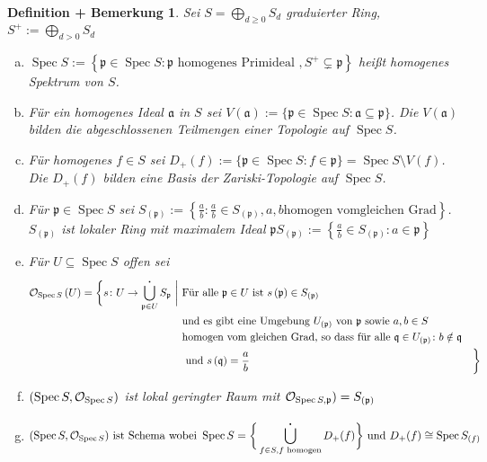 \documentclass[a4paper,oneside]{scrbook}
\theoremstyle{break}
\newtheorem{DefBem}[Def]{Definition + Bemerkung}
\theoremstyle{nonumberbreak}
\theoremstyle{nonumberplain}
\theoremstyle{break}
\newcommand{\Proj}{%
	\ensuremath{\operatorname{Spec}}%
}
\begin{document}
\begin{DefBem}
	Sei $S = \bigoplus_{d \geq 0} S_d$ graduierter Ring, $S^+:=\bigoplus_{d > 0} S_d$
	\begin{enumerate}[(a)]
		\item  $\Proj S := \left\lbrace \mathfrak{p} \in \Proj S: \mathfrak{p} \text{ homogenes Primideal }, S^+ \subsetneq \mathfrak{p} \right\rbrace $ heißt \emph{homogenes Spektrum} von $S$.
		\item Für ein homogenes Ideal $\mathfrak a$ in $S$ sei $V(\mathfrak{a}) := \{\mathfrak{p} \in \Proj S : \mathfrak{a \subseteq p} \}$. Die $V(\mathfrak{a})$ bilden die abgeschlossenen Teilmengen einer Topologie auf $\Proj S$.
		\item Für homogenes $f \in S$ sei $D_+(f):=\{\mathfrak{p} \in \Proj S : f \in \mathfrak p\} = \Proj S \setminus V(f)$. Die $D_+(f)$ bilden eine Basis der Zariski-Topologie auf $\Proj S$.
		\item Für $\mathfrak{p} \in \Proj S$ sei $S_{(\mathfrak{p})}:= \left\lbrace \frac{a}{b}:\frac{a}{b} \in S_{(\mathfrak{p})},a,b \text{homogen vomgleichen Grad}  \right\rbrace $. $S_{(\mathfrak{p})}$ ist lokaler Ring mit maximalem Ideal $\mathfrak{p}S_{(\mathfrak{p})} := \left\lbrace \frac{a}{b} \in S_{(\mathfrak{p})} : a \in \mathfrak{p} \right\rbrace $
		\item  Für $U \subseteq \Proj S$ offen sei 
			\begin{align*}
			\mathcal{O}_{\Proj S}\left(U\right) = 
				\bigg\{ s\colon U \to \bigcup_{ \mathfrak{p} \in U }^{\centerdot} S_{\mathfrak{p}}\ \bigg|\
					& \text{Für alle } \mathfrak{p} \in U \text{ ist } s\left(\mathfrak{p}\right) \in S_{(\mathfrak{p})}\\
					& \text{und es gibt eine Umgebung } U_{(\mathfrak{p})} \text{ von } \mathfrak{p}
					\text{ sowie } a,b \in S \\ 
					& \text{homogen vom gleichen Grad, so dass für alle } \mathfrak{q} \in U_{(\mathfrak{p})}\colon b \notin \mathfrak{q} \\
					& \text{ und } s\left(\mathfrak{q}\right) = \frac{a}{b}
					& \bigg\}
		\end{align*}
		\item $(\Proj S, \mathcal{O}_{\Proj S})$ ist lokal geringter Raum mit $\mathcal{O}_{\Proj S, \mathfrak{p}}) = S_{(\mathfrak p)}$
		\item \begin{align*} (\Proj S, \mathcal{O}_{\Proj S})  \text{ ist Schema wobei } \Proj S = \bigg\{\bigcup^{\centerdot}_{ f  \in S, f \text{ homogen} }D_+(f) \bigg\} \text{ und }D_+(f) \cong \Proj S_{(f)}
		       \end{align*}

	\end{enumerate}
\end{DefBem}
\end{document}

